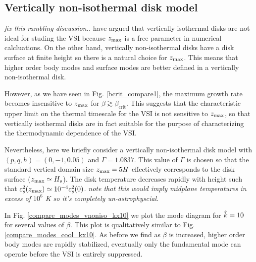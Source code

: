 \subsection{Vertically non-isothermal disk model} 
\emph{fix this rambling discussion..}
 have argued that vertically isothermal disks are not
ideal for studing the VSI because $z_\mathrm{max}$ is a free 
parameter in numerical calcluations. On the other hand, vertically 
non-isothermal disks have a disk surface at finite height so there is
a natural choice for $z_\mathrm{max}$. This means that higher order body modes and
surface modes are better defined in a vertically non-isothermal disk.   

However, as we have seen in Fig. \ref{bcrit_compare1}, the maximum
growth rate becomes insensitive to $z_\mathrm{max}$ for $\beta\gtrsim
\beta_\mathrm{crit}$. This suggests that the characteristic upper
limit on the thermal timescale for the VSI is not sensitive to
$z_\mathrm{max}$, so that vertically isothermal disks are in fact suitable for
the purpose of characterizing the thermodynamic dependence of the
VSI. 


Nevertheless, here we briefly consider a vertically non-isothermal
disk model with $(p,q, h)=(0,-1,0.05)$ and $\Gamma=1.0837$. This
value of $\Gamma$ is chosen so that the standard vertical domain size $z_\mathrm{max} =
5H$ effectively corresponds to the disk surface ($z_\mathrm{max}\simeq
H_s$). The disk temperature decreases rapidly with height such that 
$c_s^2(z_\mathrm{max})\simeq 10^{-4}c_s^2(0)$.    \emph{note that this would imply midplane
temperatures in excess of $10^6$ K so it's completely un-astrophyscial.}

In Fig. \ref{compare_modes_vnoniso_kx10} we plot the mode diagram for
$\hat{k}=10$ for several values of $\beta$. This plot is 
qualitatively similar to Fig. \ref{compare_modes_cool_kx10}. As before
we find as $\beta$ is increased, higher order body modes are rapidly
stabilized, eventually only the fundamental mode can operate before
the VSI is entirely suppressed.  

